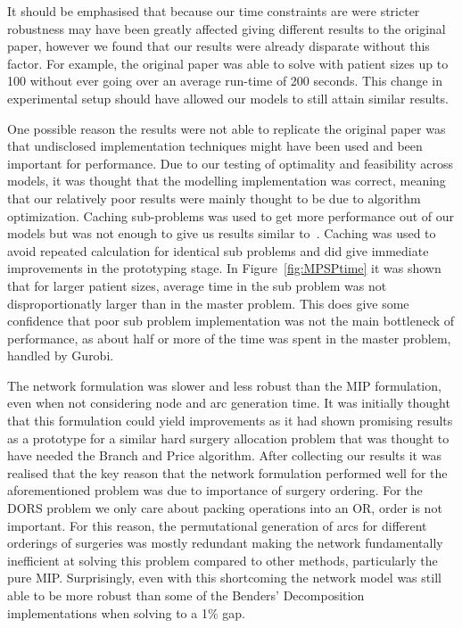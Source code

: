It should be emphasised that because our time constraints are were stricter robustness may have been greatly affected giving different results to the original paper, however we found that our results were already disparate without this factor. For example, the original paper was able to solve with patient sizes up to 100 without ever going over an average run-time of 200 seconds. This change in experimental setup should have allowed our models to still attain similar results.

One possible reason the results were not able to replicate the original paper was that undisclosed implementation techniques might have been used and been important for performance. Due to our testing of optimality and feasibility across models, it was thought that the modelling implementation was correct, meaning that our relatively poor results were mainly thought to be due to algorithm optimization. Caching sub-problems was used to get more performance out of our models but was not enough to give us results similar to~\cite{roshanaei2017propagating}. Caching was used to avoid repeated calculation for identical sub problems and did give immediate improvements in the prototyping stage. In Figure~\ref{fig:MPSPtime} it was shown that for larger patient sizes, average time in the sub problem was not disproportionatly larger than in the master problem. This does give some confidence that poor sub problem implementation was not the main bottleneck of performance, as about half or more of the time was spent in the master problem, handled by Gurobi. 

The network formulation was slower and less robust than the MIP formulation, even when not considering node and arc generation time. It was initially thought that this formulation could yield improvements as it had shown promising results as a prototype for a similar hard surgery allocation problem that was thought to have needed the Branch and Price algorithm\cite{DoulabiBranchPriceOR}. After collecting our results it was realised that the key reason that the network formulation performed well for the aforementioned problem was due to importance of surgery ordering. For the DORS problem we only care about packing operations into an OR, order is not important. For this reason, the permutational generation of arcs for different orderings of surgeries was mostly redundant making the network fundamentally inefficient at solving this problem compared to other methods, particularly the pure MIP. Surprisingly, even with this shortcoming the network model was still able to be more robust than some of the Benders' Decomposition implementations when solving to a 1\% gap.

